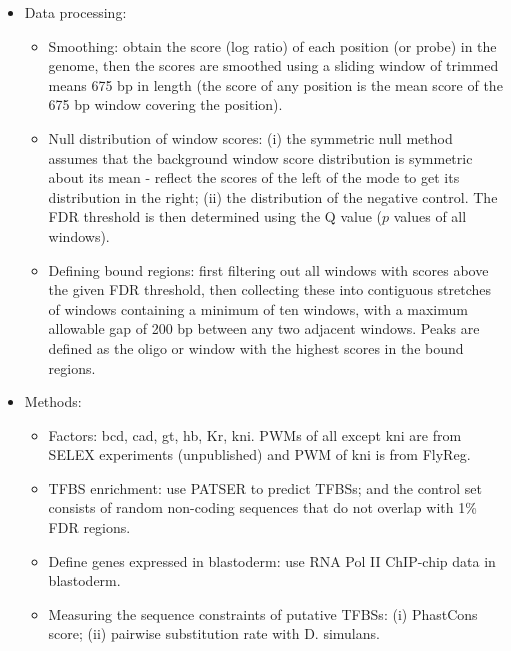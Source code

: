\documentclass{report}
\begin{document}
\begin{enumerate}
\begin{itemize}
		\item Data processing: 
		\begin{itemize}
			\item Smoothing: obtain the score (log ratio) of each position (or probe) in the genome, then the scores are smoothed using a sliding window of trimmed means 675 bp in length (the score of any position is the mean score of the 675 bp window covering the position). 
			\item Null distribution of window scores: (i) the symmetric null method assumes that the background window score distribution is symmetric about its mean - reflect the scores of the left of the mode to get its distribution in the right; (ii) the distribution of the negative control. The FDR threshold is then determined using the Q value ($p$ values of all windows).  
			\item Defining bound regions: first filtering out all windows with scores above the given FDR threshold, then collecting these into contiguous stretches of windows containing a minimum of ten windows, with a maximum allowable gap of 200 bp between any two adjacent windows. Peaks are defined as the oligo or window with the highest scores in the bound regions. 
		\end{itemize}
		
		\item Methods: 
		\begin{itemize}
			\item Factors: bcd, cad, gt, hb, Kr, kni. PWMs of all except kni are from SELEX experiments (unpublished) and PWM of kni is from FlyReg. 
			\item TFBS enrichment: use PATSER to predict TFBSs; and the control set consists of random non-coding sequences that do not overlap with 1\% FDR regions. 
			\item Define genes expressed in blastoderm: use RNA Pol II ChIP-chip data in blastoderm. 
			\item Measuring the sequence constraints of putative TFBSs: (i) PhastCons score; (ii) pairwise substitution rate with D. simulans. 
		\end{itemize}
		

\end{itemize}
\end{enumerate}
\end{document}
